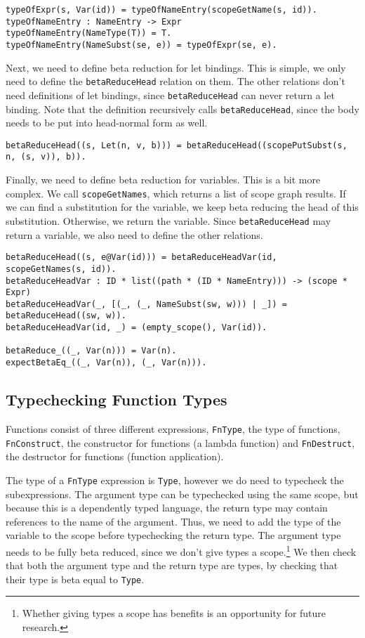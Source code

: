 \begin{lstlisting}
typeOfExpr(s, Var(id)) = typeOfNameEntry(scopeGetName(s, id)).
typeOfNameEntry : NameEntry -> Expr
typeOfNameEntry(NameType(T)) = T.
typeOfNameEntry(NameSubst(se, e)) = typeOfExpr(se, e).
\end{lstlisting}

Next, we need to define beta reduction for let bindings. This is simple, we only need to define the \verb|betaReduceHead| relation on them. The other relations don't need definitions of let bindings, since \verb|betaReduceHead| can never return a let binding. Note that the definition recursively calls \verb|betaReduceHead|, since the body needs to be put into head-normal form as well.

\begin{lstlisting}
betaReduceHead((s, Let(n, v, b))) = betaReduceHead((scopePutSubst(s, n, (s, v)), b)).
\end{lstlisting}

Finally, we need to define beta reduction for variables. This is a bit more complex. We call \verb|scopeGetNames|, which returns a list of scope graph results. If we can find a substitution for the variable, we keep beta reducing the head of this substitution. Otherwise, we return the variable. Since \verb|betaReduceHead| may return a variable, we also need to define the other relations.

\begin{lstlisting}
betaReduceHead((s, e@Var(id))) = betaReduceHeadVar(id, scopeGetNames(s, id)).
betaReduceHeadVar : ID * list((path * (ID * NameEntry))) -> (scope * Expr)
betaReduceHeadVar(_, [(_, (_, NameSubst(sw, w))) | _]) = betaReduceHead((sw, w)).
betaReduceHeadVar(id, _) = (empty_scope(), Var(id)).

betaReduce_((_, Var(n))) = Var(n).
expectBetaEq_((_, Var(n)), (_, Var(n))).
\end{lstlisting}

\subsection{Typechecking Function Types}

Functions consist of three different expressions, \verb|FnType|, the type of functions, \verb|FnConstruct|, the constructor for functions (a lambda function) and \verb|FnDestruct|, the destructor for functions (function application).

 The type of a \verb|FnType| expression is \verb|Type|, however we do need to typecheck the subexpressions. The argument type can be typechecked using the same scope, but because this is a dependently typed language, the return type may contain references to the name of the argument. Thus, we need to add the type of the variable to the scope before typechecking the return type. The argument type needs to be fully beta reduced, since we don't give types a scope.\footnote{Whether giving types a scope has benefits is an opportunity for future research.} We then check that both the argument type and the return type are types, by checking that their type is beta equal to \verb|Type|.
 
